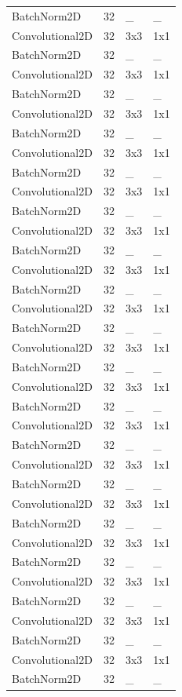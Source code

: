 \begin{center}
\begin{longtable}{|l|l|l|l|}
		BatchNorm2D & 32 & \_ & \_ \\
		Convolutional2D & 32 & 3x3 & 1x1 \\
		BatchNorm2D & 32 & \_ & \_ \\
		Convolutional2D & 32 & 3x3 & 1x1 \\
		BatchNorm2D & 32 & \_ & \_ \\
		Convolutional2D & 32 & 3x3 & 1x1 \\
		BatchNorm2D & 32 & \_ & \_ \\
		Convolutional2D & 32 & 3x3 & 1x1 \\
		BatchNorm2D & 32 & \_ & \_ \\
		Convolutional2D & 32 & 3x3 & 1x1 \\
		BatchNorm2D & 32 & \_ & \_ \\
		Convolutional2D & 32 & 3x3 & 1x1 \\
		BatchNorm2D & 32 & \_ & \_ \\
		Convolutional2D & 32 & 3x3 & 1x1 \\
		BatchNorm2D & 32 & \_ & \_ \\
		Convolutional2D & 32 & 3x3 & 1x1 \\
		BatchNorm2D & 32 & \_ & \_ \\
		Convolutional2D & 32 & 3x3 & 1x1 \\
		BatchNorm2D & 32 & \_ & \_ \\
		Convolutional2D & 32 & 3x3 & 1x1 \\
		BatchNorm2D & 32 & \_ & \_ \\
		Convolutional2D & 32 & 3x3 & 1x1 \\
		BatchNorm2D & 32 & \_ & \_ \\
		Convolutional2D & 32 & 3x3 & 1x1 \\
		BatchNorm2D & 32 & \_ & \_ \\
		Convolutional2D & 32 & 3x3 & 1x1 \\
		BatchNorm2D & 32 & \_ & \_ \\
		Convolutional2D & 32 & 3x3 & 1x1 \\
		BatchNorm2D & 32 & \_ & \_ \\
		Convolutional2D & 32 & 3x3 & 1x1 \\
		BatchNorm2D & 32 & \_ & \_ \\
		Convolutional2D & 32 & 3x3 & 1x1 \\
		BatchNorm2D & 32 & \_ & \_ \\
		Convolutional2D & 32 & 3x3 & 1x1 \\
		BatchNorm2D & 32 & \_ & \_ \\

\end{longtable}
\end{center}
